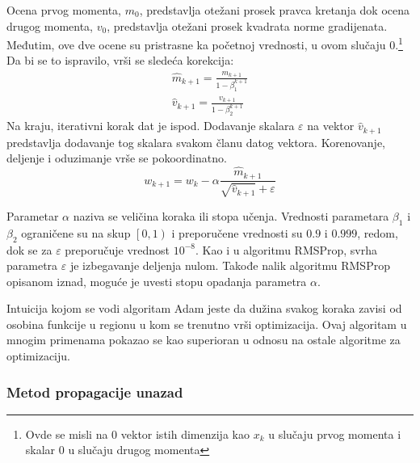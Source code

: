 Ocena prvog momenta, $m_0$, predstavlja otežani prosek pravca kretanja dok ocena drugog momenta, $v_0$, predstavlja otežani prosek kvadrata norme gradijenata. Međutim, ove dve ocene su pristrasne ka početnoj vrednosti, u ovom slučaju $0$.\footnote{Ovde se misli na $0$ vektor istih dimenzija kao $x_k$ u slučaju prvog momenta i skalar $0$ u slučaju drugog momenta} Da bi se to ispravilo, vrši se sledeća korekcija:
\begin{equation}
	\begin{gathered}
		\hat{m}_{k+1} = \frac{m_{k+1} }{1 - \beta_1^{k+1}} \\
		\hat{v}_{k+1} = \frac{v_{k+1} }{1 - \beta_2^{k+1}}
	\end{gathered}
\end{equation}
Na kraju, iterativni korak dat je ispod. Dodavanje skalara $\varepsilon$ na vektor $\hat{v}_{k+1}$ predstavlja dodavanje tog skalara svakom članu datog vektora. Korenovanje, deljenje i oduzimanje vrše se pokoordinatno.
\begin{equation}
	w_{k+1} = w_k - \alpha \frac{\hat{m}_{k+1}}{\sqrt{\hat{v}_{k+1}} + \varepsilon}
\end{equation}

Parametar $\alpha$ naziva se veličina koraka ili stopa učenja. Vrednosti parametara $\beta_1$ i $\beta_2$ ograničene su na skup $\left[0, 1\right) $ i preporučene vrednosti su $0.9$ i $0.999$, redom, dok se za $\varepsilon$ preporučuje vrednost $10^{-8}$. Kao i u algoritmu RMSProp, svrha parametra $\varepsilon$ je izbegavanje deljenja nulom. Takođe nalik algoritmu RMSProp opisanom iznad, moguće je uvesti stopu opadanja parametra $\alpha$.
\par
Intuicija kojom se vodi algoritam Adam jeste da dužina svakog koraka zavisi od osobina funkcije u regionu u kom se trenutno vrši optimizacija. Ovaj algoritam u mnogim primenama pokazao se kao superioran u odnosu na ostale algoritme za optimizaciju.



\subsubsection{Metod propagacije unazad}
\label{subsub:backprop}

